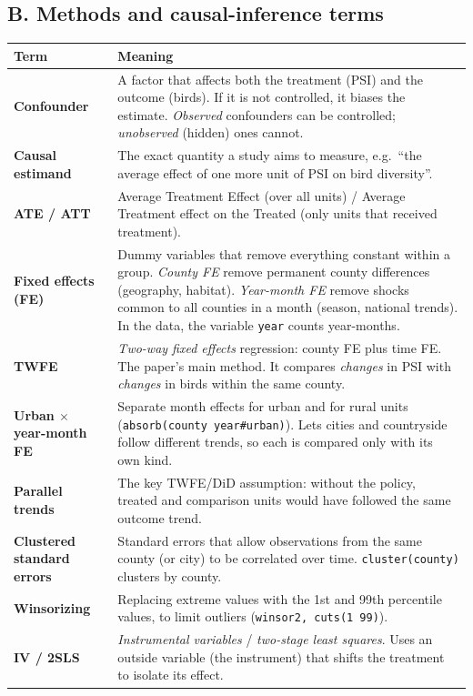 \documentclass[11pt]{article}
\begin{document}
\subsection*{B. Methods and causal-inference terms}
\begin{table}[H]\centering\small
\begin{tabularx}{\linewidth}{>{\bfseries}l>{\raggedright\arraybackslash}X}
\toprule
Term & Meaning\\
\midrule
Confounder & A factor that affects both the treatment (PSI) and the outcome (birds). If it is not controlled, it biases the estimate. \emph{Observed} confounders can be controlled; \emph{unobserved} (hidden) ones cannot.\\
Causal estimand & The exact quantity a study aims to measure, e.g.\ ``the average effect of one more unit of PSI on bird diversity''.\\
ATE / ATT & Average Treatment Effect (over all units) / Average Treatment effect on the Treated (only units that received treatment).\\
Fixed effects (FE) & Dummy variables that remove everything constant within a group. \emph{County FE} remove permanent county differences (geography, habitat). \emph{Year-month FE} remove shocks common to all counties in a month (season, national trends). In the data, the variable \texttt{year} counts year-months.\\
TWFE & \emph{Two-way fixed effects} regression: county FE plus time FE. The paper's main method. It compares \emph{changes} in PSI with \emph{changes} in birds within the same county.\\
Urban $\times$ year-month FE & Separate month effects for urban and for rural units (\texttt{absorb(county year\#urban)}). Lets cities and countryside follow different trends, so each is compared only with its own kind.\\
Parallel trends & The key TWFE/DiD assumption: without the policy, treated and comparison units would have followed the same outcome trend.\\
Clustered standard errors & Standard errors that allow observations from the same county (or city) to be correlated over time. \texttt{cluster(county)} clusters by county.\\
Winsorizing & Replacing extreme values with the 1st and 99th percentile values, to limit outliers (\texttt{winsor2, cuts(1 99)}).\\
IV / 2SLS & \emph{Instrumental variables} / \emph{two-stage least squares}. Uses an outside variable (the instrument) that shifts the treatment to isolate its effect.\\

\end{tabularx}
\end{table}
\end{document}
